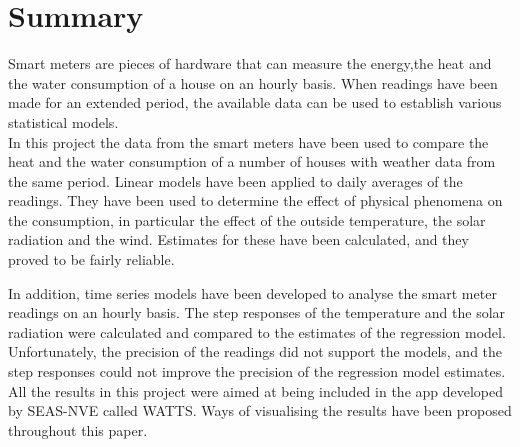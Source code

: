 \chapter{Summary}
Smart meters are pieces of hardware that can measure the energy,the heat and the water consumption of a house on an hourly basis. When readings have been made for an extended period, the available data can be used to establish various statistical models.\\

\noindent In this project the data from the smart meters have been used to compare the heat and the water consumption of a number of houses with weather data from the same period. Linear models have been applied to daily averages of the readings. They have been used to determine the effect of physical phenomena on the consumption, in particular the effect of the outside temperature, the solar radiation and the wind. Estimates for these have been calculated, and they proved to be fairly reliable.

\noindent In addition, time series models have been developed to analyse the smart meter readings on an hourly basis. The step responses of the temperature and the solar radiation were calculated and compared to the estimates of the regression model. Unfortunately, the precision of the readings did not support the models, and the step responses could not improve the precision of the regression model estimates. \\

\noindent All the results in this project were aimed at being included in the app developed by SEAS-NVE called WATTS. Ways of visualising the results have been proposed throughout this paper.